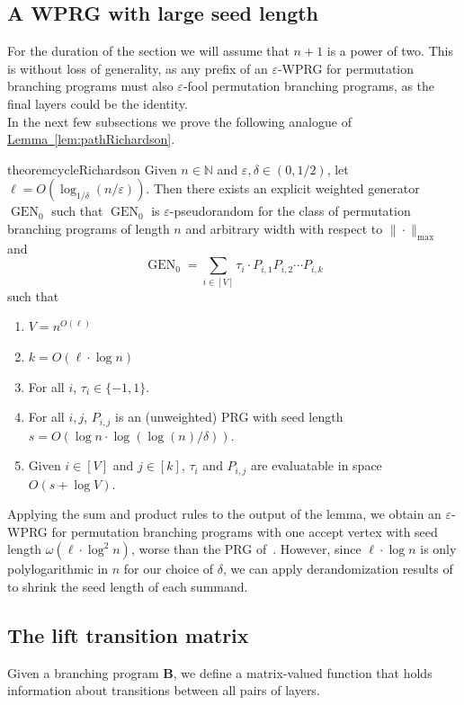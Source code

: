 \documentclass[11pt]{article}
\numberwithin{equation}{section}
\theoremstyle{definition}
\theoremstyle{plain}
\newcommand{\N}{\mathbb N}
\newcommand{\expref}[2]{\hyperref[#2]{#1~\ref{#2}}}
\newcommand{\eps}{\varepsilon}
\DeclareMathOperator{\gen}{GEN}
\newcommand{\bp}{{\mathbf{B}}}
\begin{document}
\subsection{A WPRG with large seed length}
For the duration of the section we will assume that $n+1$ is a power of two. This is without loss of generality, as any prefix of an $\eps$-WPRG for permutation branching programs must also $\eps$-fool permutation branching programs, as the final layers could be the identity.\\ 

In the next few subsections we prove the following analogue of 
\expref{Lemma}{lem:pathRichardson}. %
\begin{restatable}{theorem}{cycleRichardson}
\label{thm:cycleRichardson}
Given $n \in \N$ and $\eps,\delta \in (0,1/2)$, let $\ell=O( \log_{1/\delta}(n/\eps))$. 
Then there exists an explicit weighted generator $\gen_0$ such that $\gen_0$ is $\eps$-pseudorandom for the class of permutation branching programs of length $n$ and arbitrary width with respect to $\|\cdot\|_{\max}$ and 
\[\gen_0 = \sum_{i\in [V]}\tau_i\cdot P_{i,1}P_{i,2}\cdots P_{i,k}\]
such that %
\begin{enumerate}
    \item $V=n^{O(\ell)}$
    \item $k=O(\ell\cdot \log n)$
    \item For all $i$, $\tau_i\in \{-1,1\}$.
    \item For all $i,j$, $P_{i,j}$ is an (unweighted) PRG with seed length $s=O(\log n \cdot\log(\log(n)/\delta))$.
    \item Given $i\in [V]$ and $j\in [k]$, $\tau_i$ and $P_{i,j}$ are evaluatable in space $O(s+\log V)$.
\end{enumerate}
\end{restatable}

Applying the sum and product rules to the output of the lemma, we obtain an $\eps$-WPRG for permutation branching programs with one accept vertex with seed length $\omega(\ell\cdot \log^2 n)$, worse than the PRG of~\cite{HozaPyVa21}. However, since $\ell\cdot \log n$ is only polylogarithmic in $n$ for our choice of $\delta$, we can apply derandomization results of~\cite{HozaPyVa21} to shrink the seed length of each summand. 

\subsection{The lift transition matrix}
Given a branching program $\bp$, we define a %
matrix-valued %
function that holds information about transitions between all pairs of layers.
\end{document}
